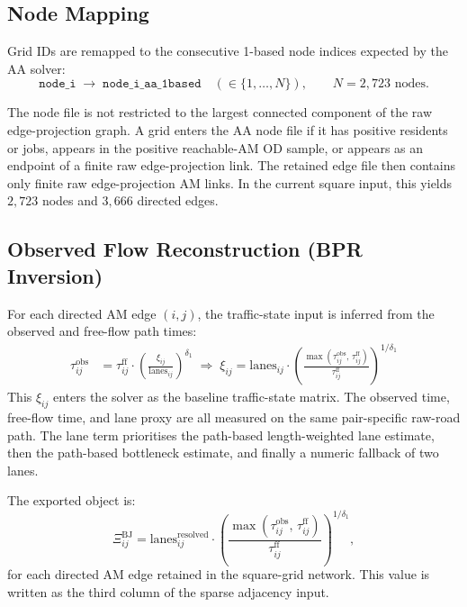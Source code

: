 \documentclass[12pt, a4paper]{article}
\begin{document}
\subsection{Node Mapping}

Grid IDs are remapped to the consecutive 1-based node indices expected by
the AA solver:
\begin{equation}
  \texttt{node\_i} \;\longrightarrow\; \texttt{node\_i\_aa\_1based}
  \quad (\in \{1, \ldots, N\}), \qquad N = 2{,}723 \text{ nodes.}
\end{equation}

The node file is not restricted to the largest connected component of the
raw edge-projection graph.  A grid enters the AA node file if it has positive
residents or jobs, appears in the positive reachable-AM OD sample, or appears
as an endpoint of a finite raw edge-projection link.  The retained edge file
then contains only finite raw edge-projection AM links.  In the current
square input, this yields $2{,}723$ nodes and $3{,}666$ directed edges.

\subsection{Observed Flow Reconstruction (BPR Inversion)}

For each directed AM edge $(i,j)$, the traffic-state input is inferred from
the observed and free-flow path times:
\begin{align}
  \tau_{ij}^{\text{obs}} &= \tau_{ij}^{\text{ff}}
    \cdot \left(\frac{\xi_{ij}}{\text{lanes}_{ij}}\right)^{\delta_1}
  \;\Longrightarrow\;
  \xi_{ij} = \text{lanes}_{ij}
    \cdot \left(\frac{\max(\tau_{ij}^{\text{obs}},\,\tau_{ij}^{\text{ff}})}
                     {\tau_{ij}^{\text{ff}}}\right)^{1/\delta_1}
  \label{eq:xi}
\end{align}
This $\xi_{ij}$ enters the solver as the baseline traffic-state matrix.  The
observed time, free-flow time, and lane proxy are all measured on the same
pair-specific raw-road path.  The lane term prioritises the path-based
length-weighted lane estimate, then the path-based bottleneck estimate, and
finally a numeric fallback of two lanes.

The exported object is:
\begin{equation}
  \Xi_{ij}^{\text{BJ}} =
  \text{lanes}_{ij}^{\text{resolved}}
  \cdot
  \left(\frac{\max(\tau_{ij}^{\text{obs}},\,\tau_{ij}^{\text{ff}})}
             {\tau_{ij}^{\text{ff}}}\right)^{1/\delta_1},
  \label{eq:xi_bj_export}
\end{equation}
for each directed AM edge retained in the square-grid network.  This value is
written as the third column of the sparse adjacency input.
\end{document}
